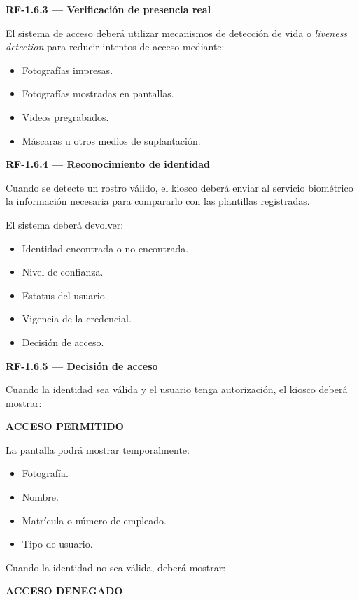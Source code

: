 \documentclass[12pt,a4paper]{article}
\newcommand{\RF}[1]{\textbf{\color{primary}RF-#1}}
\newenvironment{requisito}[1]
{
\begin{center}
\begin{minipage}{0.96\textwidth}
\colorbox{requirement}{
\begin{minipage}{0.94\textwidth}
\textbf{#1}
\end{minipage}
}
\vspace{2mm}
}
{
\end{minipage}
\end{center}
}
\begin{document}
\begin{requisito}{\RF{1.6.3} --- Verificación de presencia real}
El sistema de acceso deberá utilizar mecanismos de detección de vida o
\textit{liveness detection} para reducir intentos de acceso mediante:

\begin{itemize}[leftmargin=*]
\item Fotografías impresas.
\item Fotografías mostradas en pantallas.
\item Videos pregrabados.
\item Máscaras u otros medios de suplantación.
\end{itemize}
\end{requisito}

\begin{requisito}{\RF{1.6.4} --- Reconocimiento de identidad}
Cuando se detecte un rostro válido, el kiosco deberá enviar al servicio
biométrico la información necesaria para compararlo con las plantillas
registradas.

El sistema deberá devolver:

\begin{itemize}[leftmargin=*]
\item Identidad encontrada o no encontrada.
\item Nivel de confianza.
\item Estatus del usuario.
\item Vigencia de la credencial.
\item Decisión de acceso.
\end{itemize}
\end{requisito}

\begin{requisito}{\RF{1.6.5} --- Decisión de acceso}
Cuando la identidad sea válida y el usuario tenga autorización, el kiosco deberá
mostrar:

\begin{center}
\textbf{ACCESO PERMITIDO}
\end{center}

La pantalla podrá mostrar temporalmente:

\begin{itemize}[leftmargin=*]
\item Fotografía.
\item Nombre.
\item Matrícula o número de empleado.
\item Tipo de usuario.
\end{itemize}

Cuando la identidad no sea válida, deberá mostrar:

\begin{center}
\textbf{ACCESO DENEGADO}
\end{center}
\end{requisito}
\end{document}
